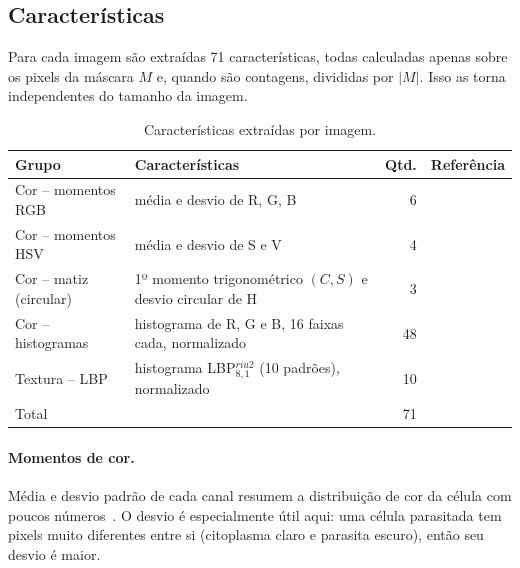 \documentclass[11pt,a4paper]{article}
\begin{document}
\subsection{Características}

Para cada imagem são extraídas 71 características, todas calculadas apenas sobre os pixels da
máscara $M$ e, quando são contagens, divididas por $|M|$. Isso as torna independentes do tamanho da
imagem.

\begin{table}[H]
\centering
\caption{Características extraídas por imagem.}\label{tab:features}
\begin{tabular}{lp{7.2cm}rl}
\toprule
Grupo & Características & Qtd. & Referência \\
\midrule
Cor -- momentos RGB & média e desvio de R, G, B & 6 & \cite{stricker1995} \\
Cor -- momentos HSV & média e desvio de S e V & 4 & \cite{stricker1995} \\
Cor -- matiz (circular) & 1º momento trigonométrico $(C,S)$ e desvio circular de H & 3 & \cite{mardia2000} \\
Cor -- histogramas & histograma de R, G e B, 16 faixas cada, normalizado & 48 & \cite{swain1991} \\
Textura -- LBP & histograma LBP$^{riu2}_{8,1}$ (10 padrões), normalizado & 10 & \cite{ojala2002} \\
\midrule
Total & & 71 & \\
\bottomrule
\end{tabular}
\end{table}

\paragraph{Momentos de cor.} Média e desvio padrão de cada canal resumem a distribuição de cor da
célula com poucos números~\cite{stricker1995}. O desvio é especialmente útil aqui: uma célula
parasitada tem pixels muito diferentes entre si (citoplasma claro e parasita escuro), então seu desvio
é maior.
\end{document}
